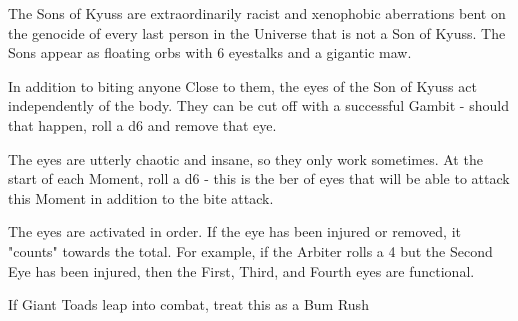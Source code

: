 {The Sons of Kyuss are extraordinarily racist and xenophobic aberrations bent on the genocide of every last person in the Universe that is not a Son of Kyuss.  The Sons appear as floating orbs with 6 eyestalks and a gigantic maw.

In addition to biting anyone Close to them, the eyes of the Son of Kyuss act independently of the body.  They can be cut off with a successful Gambit - should that happen, roll a d6 and remove that eye.

The eyes are utterly chaotic and insane, so they only work sometimes.  At the start of each Moment, roll a d6 - this is the ber of eyes that will be able to attack this Moment in addition to the bite attack.



The eyes are activated in order.  If the eye has been injured or removed, it "counts" towards the total.  For example, if the Arbiter rolls a 4 but the Second Eye has been injured, then the First, Third, and Fourth eyes are functional.

\newpage



\MONSTERBLOCK[
  Name=Giant Toad,
  Link=monster-giant-toad,
  MV=Base,
  WK=d24,
  DMG=d4 1 Nearby,
  HD=1,
  Power=Average,
  Soak=1,
  Morale=Orderly,
  Save=1,
  Extras={Leaper}
]

If Giant Toads leap into combat, treat this as a Bum Rush

\MONSTERBLOCK[
  Name=Toad Man,
  Link=monster-toad-man,
  MV=Base,
  WK=d20,
  DMG=2d4 1 Close,
  HD=3,
  Power=Average,
  Soak=0,
  Morale=Orderly,
  Save=2,
  Extras={Leaper}
]

}
